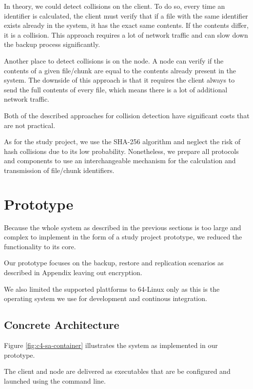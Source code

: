In theory, we could detect collisions on the \gls{client}. To do so, every time an identifier is calculated, the \gls{client} must verify that if a file with the same identifier exists already in the system, it has the exact same contents. If the contents differ, it is a collision. This approach requires a lot of network traffic and can slow down the backup process significantly.

Another place to detect collisions is on the \gls{node}. A \gls{node} can verify if the contents of a given file/chunk are equal to the contents already present in the system. The downside of this approach is that it requires the \gls{client} always to send the full contents of every file, which means there is a lot of additional network traffic.

Both of the described approaches for collision detection have significant costs that are not practical.

As for the study project, we use the SHA-256 algorithm\cite{sha-256} and neglect the risk of hash collisions due to its low probability. Nonetheless, we prepare all protocols and components to use an interchangeable mechanism for the calculation and transmission of file/chunk identifiers.

\section{Prototype}\label{sec:prototype}

Because the whole system as described in the previous sections is too large and complex to implement in the form of a study project prototype, we reduced the functionality to its core.

Our prototype focuses on the backup, restore and replication scenarios as described in Appendix  leaving out encryption.

We also limited the supported plattforms to 64-Linux only as this is the operating system we use for development and continous integration.

\subsection{Concrete Architecture}

Figure \ref{fig:c4-sa-container} illustrates the system as implemented in our prototype.

The \gls{client} and \gls{node} are delivered as executables that are be configured and launched using the command line.

